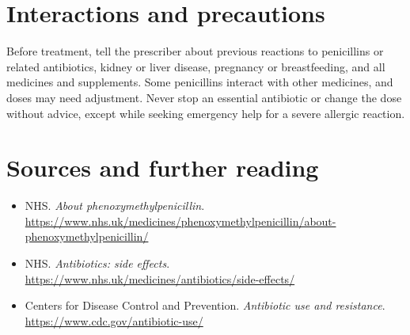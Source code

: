 \section*{Interactions and precautions}
Before treatment, tell the prescriber about previous reactions to penicillins or related antibiotics, kidney or liver disease, pregnancy or breastfeeding, and all medicines and supplements. Some penicillins interact with other medicines, and doses may need adjustment. Never stop an essential antibiotic or change the dose without advice, except while seeking emergency help for a severe allergic reaction.

\section*{Sources and further reading}
\begin{itemize}
\item NHS. \textit{About phenoxymethylpenicillin}. \url{https://www.nhs.uk/medicines/phenoxymethylpenicillin/about-phenoxymethylpenicillin/}
\item NHS. \textit{Antibiotics: side effects}. \url{https://www.nhs.uk/medicines/antibiotics/side-effects/}
\item Centers for Disease Control and Prevention. \textit{Antibiotic use and resistance}. \url{https://www.cdc.gov/antibiotic-use/}
\end{itemize}

